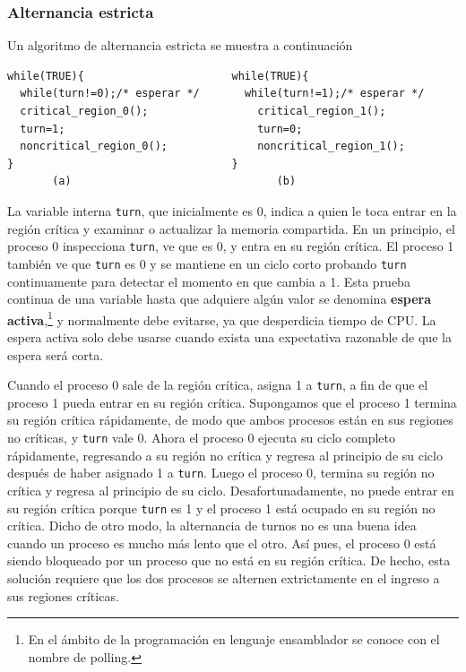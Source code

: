 \documentclass{article}
\begin{document}
\subsubsection*{Alternancia estricta}
Un algoritmo de alternancia estricta se muestra a continuaci\'on
\begin{verbatim}
while(TRUE){                       while(TRUE){
  while(turn!=0);/* esperar */       while(turn!=1);/* esperar */
  critical_region_0();                 critical_region_1();
  turn=1;                              turn=0;
  noncritical_region_0();              noncritical_region_1();
}                                  }
       (a)                                (b)
\end{verbatim}
La variable interna {\tt turn}, que inicialmente es 0, indica a quien le 
toca entrar en la regi\'on cr\'itica y examinar o actualizar la memoria 
compartida. En un principio, el proceso 0 inspecciona {\tt turn}, ve que es 
0, y entra en su regi\'on cr\'itica. El proceso 1 tambi\'en ve que {\tt turn} 
es 0 y se mantiene en un ciclo corto probando {\tt turn} continuamente para 
detectar el momento en que cambia a 1. Esta prueba continua de una variable 
hasta que adquiere alg\'un valor se denomina {\bf espera activa},\footnote{En 
el \'ambito de la programaci\'on en lenguaje ensamblador se conoce con el 
nombre de polling.} y normalmente debe evitarse, ya que desperdicia tiempo 
de CPU. La espera activa solo debe usarse cuando exista una expectativa 
razonable de que la espera ser\'a corta. 

Cuando el proceso 0 sale de la regi\'on cr\'itica, asigna 1 a {\tt turn}, 
a f\/in de que el proceso 1 pueda entrar en su regi\'on cr\'itica. 
Supongamos que el proceso 1 termina su regi\'on cr\'itica r\'apidamente, 
de modo que ambos procesos est\'an en sus regiones no cr\'iticas, y 
{\tt turn} vale 0. Ahora el proceso 0 ejecuta su ciclo completo 
r\'apidamente, regresando a su regi\'on no cr\'itica y regresa al principio 
de su ciclo despu\'es de haber asignado 1 a {\tt turn}. Luego el proceso 
0, termina su regi\'on no cr\'itica y regresa al principio de su ciclo. 
Desafortunadamente, no puede entrar en su regi\'on cr\'itica porque 
{\tt turn} es 1 y el proceso 1 est\'a ocupado en su regi\'on no cr\'itica. 
Dicho de otro modo, la alternancia de turnos no es una buena idea  
cuando un proceso es mucho m\'as lento que el otro. As\'i pues, 
el proceso 0 est\'a siendo bloqueado por un proceso que no est\'a en su 
regi\'on cr\'itica. De hecho, esta soluci\'on requiere que los dos procesos 
se alternen extrictamente en el ingreso a sus regiones cr\'iticas.
\end{document}
